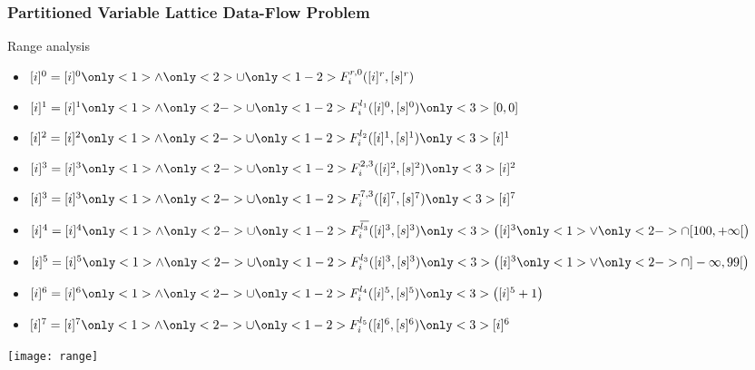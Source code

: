 \begin{frame}
\frametitle{Partitioned Variable Lattice Data-Flow Problem}
\begin{minipage}[t]{0.6\textwidth}
\vspace{-0.6cm}
{\begin{exampleblock}{Range analysis}
\begin{itemize}
\item $[i]^0 = [i]^0 \only<1>{\wedge}\only<2>{\cup} \only<1-2>{F^{r,0}_i([i]^r, [s]^r)}$
\item $[i]^1 = [i]^1 \only<1>{\wedge}\only<2->{\cup} \only<1-2>{F^{l_1}_i([i]^0, [s]^0)}\only<3>{[0,0]}$
\item $[i]^2 = [i]^2 \only<1>{\wedge}\only<2->{\cup} \only<1-2>{F^{l_2}_i([i]^1, [s]^1)}\only<3>{[i]^1}$
\item $[i]^3 = [i]^3 \only<1>{\wedge}\only<2->{\cup} \only<1-2>{F^{2,3}_i([i]^2, [s]^2)}\only<3>{[i]^2}$
\item $[i]^3 = [i]^3 \only<1>{\wedge}\only<2->{\cup} \only<1-2>{F^{7,3}_i([i]^7, [s]^7)}\only<3>{[i]^7}$
\item $[i]^4 = [i]^4 \only<1>{\wedge}\only<2->{\cup} \only<1-2>{F^{\overline{l_3}}_i([i]^3, [s]^3)}\only<3>{\left([i]^3 \only<1>{\vee}\only<2->{\cap} [100,+\infty[\right)}$
\item $[i]^5 = [i]^5 \only<1>{\wedge}\only<2->{\cup} \only<1-2>{F^{l_3}_i([i]^3, [s]^3)}\only<3>{\left([i]^3 \only<1>{\vee}\only<2->{\cap} ]-\infty,99[\right)}$
\item $[i]^6 = [i]^6 \only<1>{\wedge}\only<2->{\cup} \only<1-2>{F^{l_4}_i([i]^5, [s]^5)}\only<3>{\left( [i]^5 + 1\right)}$
\item $[i]^7 = [i]^7 \only<1>{\wedge}\only<2->{\cup} \only<1-2>{F^{l_5}_i([i]^6, [s]^6)}\only<3>{[i]^6}$
\end{itemize}
\end{exampleblock}}
\end{minipage}%
\texttt{[image: range]} 
\end{frame}

